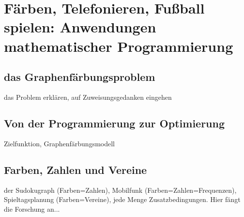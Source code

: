 \chapter{Färben, Telefonieren, Fußball spielen: Anwendungen
  mathematischer Programmierung}
\label{chap_faerbung}

\section{das Graphenfärbungsproblem}
das Problem erklären, auf Zuweisungsgedanken eingehen

\section{Von der Programmierung zur Optimierung}
Zielfunktion, Graphenfärbungsmodell

\section{Farben, Zahlen und Vereine}
der Sudokugraph (Farben=Zahlen), Mobilfunk (Farben=Zahlen=Frequenzen),
Spieltagsplanung (Farben=Vereine), jede Menge Zusatzbedingungen. Hier
fängt die Forschung an...

